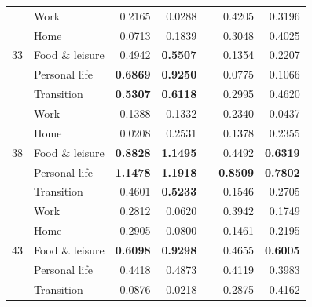 \begin{table}
\begin{center}
\begin{tabular}{ l @{\hskip 0.5in} l @{\hskip 0.5in} r r r r r}
        \hline
        						& Work					& 0.2165				& 0.0288				&	& 0.4205				& 0.3196				\\
        						& Home					& 0.0713				& 0.1839				&	& 0.3048				& 0.4025				\\
        33						& Food \& leisure		& 0.4942				& \textbf{0.5507}				&	& 0.1354				& 0.2207				\\
        						& Personal life			& \textbf{0.6869}				& \textbf{0.9250}				&	& 0.0775				& 0.1066				\\
        						& Transition			& \textbf{0.5307}				& \textbf{0.6118}				&	& 0.2995				& 0.4620				\\
        \hline
        						& Work					& 0.1388				& 0.1332				&	& 0.2340				& 0.0437				\\
        						& Home					& 0.0208				& 0.2531				&	& 0.1378				& 0.2355				\\
        38						& Food \& leisure		& \textbf{0.8828}				&\textbf{ 1.1495}				&	& 0.4492				& \textbf{0.6319}				\\
        						& Personal life			& \textbf{1.1478}				& \textbf{1.1918}				&	& \textbf{0.8509}				& \textbf{0.7802}				\\
        						& Transition			& 0.4601				& \textbf{0.5233}				&	& 0.1546				& 0.2705				\\
        \hline
        						& Work					& 0.2812				& 0.0620				&	& 0.3942				& 0.1749				\\
        						& Home					& 0.2905				& 0.0800				&	& 0.1461				& 0.2195				\\
        43						& Food \& leisure		&\textbf{0.6098}				& \textbf{0.9298}				&	& 0.4655				& \textbf{0.6005}				\\
        						& Personal life			& 0.4418				& 0.4873				&	& 0.4119				& 0.3983				\\
        						& Transition			& 0.0876				& 0.0218				&	& 0.2875				& 0.4162				\\
	\bottomrule
    \end{tabular}
    \end{center}
    \end{table}
 

